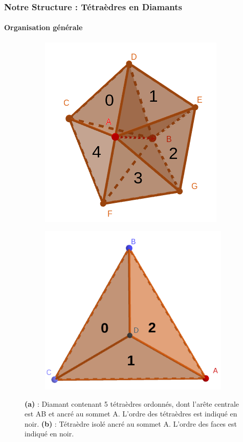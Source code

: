 \documentclass[9pt]{beamer}
\begin{document}
\begin{frame}
\small
\frametitle{Notre Structure : Tétraèdres en Diamants}
\framesubtitle{Organisation générale}

\begin{figure}[H]
\centering
\begin{subfigure}{.5\textwidth}
  \centering
  \includegraphics[scale=0.19]{../Images/tetra_ordonnee}
  \caption{}
\end{subfigure}%
\begin{subfigure}{.5\textwidth}
  \centering
  \includegraphics[scale=0.16]{../Images/tetra_number_face}
  \caption{}
\end{subfigure}
\caption{\textbf{(a)} : Diamant contenant 5 tétraèdres ordonnés, dont l'arête centrale est AB et ancré au sommet A. L'ordre des tétraèdres est indiqué en noir. \textbf{(b)} : Tétraèdre isolé ancré au sommet A. L'ordre des faces est indiqué en noir.}

\end{figure}
\end{frame}
\end{document}
